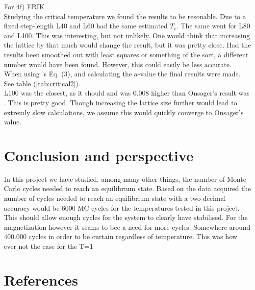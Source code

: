 \documentclass{article}
\begin{document}


For 4f) ERIK \\

Studying the critical temperature we found the results to be resonable. Due to a fixed step-length L40 and L60 had the same estimated $T_c$. The same went for L80 and L100. This was interesting, but not unlikely. One would think that increasing the lattice by that much would change the result, but it was pretty close. Had the results been smoothed out with least squares or something of the sort, a different number would have been found. However, this could easily be less accurate. When using \cite{task}'s Eq. (3), and calculating the $a$-value the final results were made. See table (\ref{tab:critical2}). \\

L100 was the closest, as it should and was 0.008 higher than Onsager's result was \cite{onsager}. This is pretty good.
Though increasing the lattice size further would lead to extremly slow calculations, we assume this would quickly converge to Onsager's value. \\


\vspace{1cm}

\section{Conclusion and perspective} \label{sec:Conclusion}

In this project we have studied, among many other things, the number of Monte Carlo cycles needed to reach an equilibrium state. Based on the data acquired the number of cycles needed to reach an equilibrium state with a two decimal accuracy would be 6000 MC cycles for the temperatures tested in this project. This should allow enough cycles for the system to clearly have stabilised. For the magnetization however it seams to bee a need for more cycles. Somewhere around 400.000 cycles in order to be curtain regardless of temperature. This was how ever not the case for the T=1 \\



\vspace{1cm}

\section{References} \label{sec:References}
\end{document}
